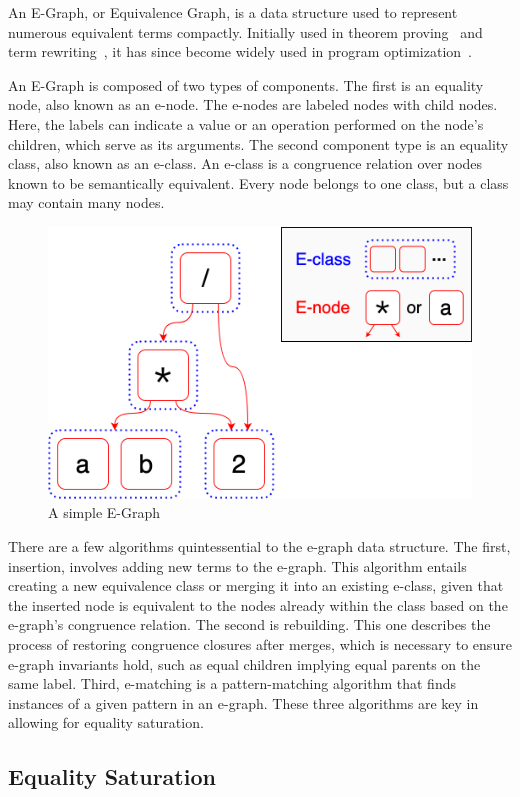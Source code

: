 \documentclass{article}
\begin{document}
An E-Graph, or Equivalence Graph, is a data structure used to represent numerous equivalent terms compactly. Initially used in theorem proving~\cite{detlefs2005} and term rewriting~\cite{nelson1979}, it has since become widely used in program optimization~\cite{eqsat-lmcs}.

An E-Graph is composed of two types of components. The first is an equality node, also known as an e-node. The e-nodes are labeled nodes with child nodes. Here, the labels can indicate a value or an operation performed on the node's children, which serve as its arguments. The second component type is an equality class, also known as an e-class. An e-class is a congruence relation over nodes known to be semantically equivalent. Every node belongs to one class, but a class may contain many nodes.

\begin{figure}
    \centering
    \includegraphics[width=0.5\linewidth]{assets/egraph.png}
    \caption{A simple E-Graph~\cite{k_2023}}
    \label{fig:egraph}
\end{figure}

There are a few algorithms quintessential to the e-graph data structure. The first, insertion, involves adding new terms to the e-graph. This algorithm entails creating a new equivalence class or merging it into an existing e-class, given that the inserted node is equivalent to the nodes already within the class based on the e-graph's congruence relation. The second is rebuilding. This one describes the process of restoring congruence closures after merges, which is necessary to ensure e-graph invariants hold, such as equal children implying equal parents on the same label. Third, e-matching is a pattern-matching algorithm that finds instances of a given pattern in an e-graph. These three algorithms are key in allowing for equality saturation.



\subsection{Equality Saturation}
\end{document}
